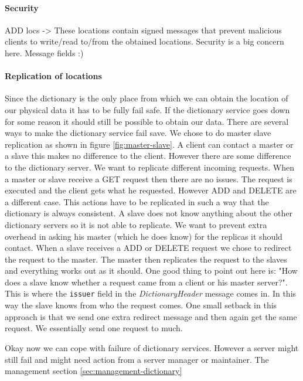\documentclass[12pt,a4paper]{scrartcl}
\begin{document}
\paragraph{Security}
ADD locs -> These locations contain signed messages that prevent malicious clients to write/read to/from the obtained locations. Security is a big concern here.
Message fields :) %

\paragraph{Replication of locations}
Since the dictionary is the only place from which we can obtain the location of our physical data it has to be fully fail safe. If the dictionary service goes down for some reason it should still be possible to obtain our data. There are several ways to make the dictionary service fail save. We chose to do master slave replication as shown in figure \ref{fig:master-slave}. A client can contact a master or a slave this makes no difference to the client. However there are some difference to the dictionary server. We want to replicate different incoming requests. When a master or slave receive a GET request then there are no issues. The request is executed and the client gets what he requested. However ADD and DELETE are a different case. This actions have to be replicated in such a way that the dictionary is always consistent. A slave does not know anything about the other dictionary servers so it is not able to replicate. We want to prevent extra overhead in asking his master (which he does know) for the replicas it should contact. When a slave receives a ADD or DELETE request we chose to redirect the request to the master. The master then replicates the request to the slaves and everything works out as it should. One good thing to point out here is: "How does a slave know whether a request came from a client or his master server?". This is where the \texttt{issuer} field in the \textit{DictionaryHeader} message comes in. In this way the slave knows from who the request comes. One small setback in this approach is that we send one extra redirect message and then again get the same request. We essentially send one request to much.

Okay now we can cope with failure of dictionary services. However a server might still fail and might need action from a server manager or maintainer. The management section \ref{sec:management-dictionary}
\end{document}
